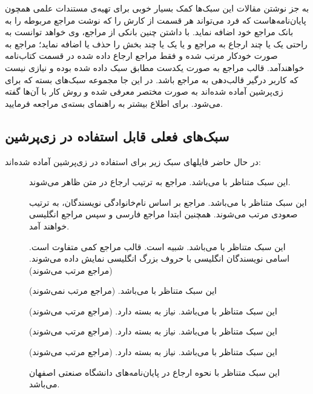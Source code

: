 به جز نوشتن مقالات این سبک‌ها کمک بسیار خوبی برای تهیه‌ی مستندات علمی همچون پایان‌نامه‌هاست که فرد می‌تواند هر قسمت از کارش را که نوشت مراجع مربوطه را به بانک مراجع خود اضافه نماید. با داشتن چنین بانکی از مراجع، وی خواهد توانست به راحتی یک یا چند ارجاع به مراجع و یا یک یا چند بخش را حذف یا اضافه ‌نماید؛ 
مراجع به صورت خودکار مرتب شده و فقط مراجع ارجاع داده شده در قسمت کتاب‌نامه خواهندآمد. قالب مراجع به صورت یکدست مطابق سبک داده شده بوده و نیازی نیست که کاربر درگیر قالب‌دهی به مراجع باشد. 
در این جا مجموعه‌ سبک‌های بسته  که برای  زی‌پرشین آماده شده‌اند به صورت مختصر معرفی شده و روش کار با آن‌ها گفته می‌شود. برای اطلاع بیشتر به راهنمای بسته‌ی  مراجعه فرمایید.
\subsection{سبک‌های فعلی قابل استفاده در زی‌پرشین}
در حال حاضر فایلهای سبک زیر برای استفاده در زی‌پرشین آماده شده‌اند:

\singlespacing
\begin{description}
\item [] این سبک متناظر با  می‌باشد. مراجع به ترتیب ارجاع در متن ظاهر می‌شوند.
\item [] این سبک متناظر با  می‌باشد. مراجع بر اساس نام‌خانوادگی نویسندگان، به ترتیب صعودی مرتب می‌شوند.
 همچنین ابتدا مراجع فارسی و سپس مراجع انگلیسی خواهند آمد.
\item [] این سبک متناظر با  می‌باشد. شبیه  است.  قالب مراجع کمی متفاوت است. اسامی نویسندگان انگلیسی با حروف بزرگ انگلیسی نمایش داده می‌شوند. (مراجع مرتب می‌شوند)
\item [] این سبک متناظر با  می‌باشد. (مراجع مرتب نمی‌شوند)
\item [] این سبک متناظر با  می‌باشد. نیاز به بسته  دارد. (مراجع مرتب می‌شوند)
\item [] این سبک متناظر با  می‌باشد. نیاز به بسته  دارد. (مراجع مرتب می‌شوند)
\item [] این سبک متناظر با  می‌باشد. نیاز به بسته  دارد. (مراجع مرتب می‌شوند)
\item[] این سبک متناظر با نحوه ارجاع در پایان‌نامه‌های دانشگاه صنعتی اصفهان می‌باشد.
\end{description}
\doublespacing

